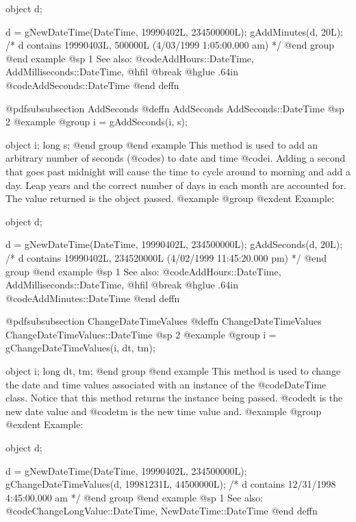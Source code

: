 object  d;

d = gNewDateTime(DateTime, 19990402L, 234500000L);
gAddMinutes(d, 20L);
/*  d contains 19990403L, 500000L
    (4/03/1999 1:05:00.000 am) */
@end group
@end example
@sp 1
See also:  @code{AddHours::DateTime, AddMilliseconds::DateTime,}
@hfil @break @hglue .64in      @code{AddSeconds::DateTime}
@end deffn











@pdfsubsubsection {AddSeconds}
@deffn {AddSeconds} AddSeconds::DateTime
@sp 2
@example
@group
i = gAddSeconds(i, s);

object  i;
long    s;
@end group
@end example
This method is used to add an arbitrary number of seconds (@code{s}) to
date and time @code{i}.  Adding a second that goes past midnight will cause
the time to cycle around to morning and add a day.  Leap years and the correct
number of days in each month are accounted for.  The value returned is the
object passed.
@example
@group
@exdent Example:

object  d;

d = gNewDateTime(DateTime, 19990402L, 234500000L);
gAddSeconds(d, 20L);
/*  d contains 19990402L, 234520000L
    (4/02/1999 11:45:20.000 pm) */
@end group
@end example
@sp 1
See also:  @code{AddHours::DateTime, AddMilliseconds::DateTime,}
@hfil @break @hglue .64in      @code{AddMinutes::DateTime}
@end deffn










@pdfsubsubsection {ChangeDateTimeValues}
@deffn {ChangeDateTimeValues} ChangeDateTimeValues::DateTime
@sp 2
@example
@group
i = gChangeDateTimeValues(i, dt, tm);

object  i;
long    dt, tm;
@end group
@end example
This method is used to change the date and time values associated
with an instance of the @code{DateTime} class.  Notice that this method
returns the instance being passed.  @code{dt} is the new date value and
@code{tm} is the new time value and.
@example
@group
@exdent Example:

object  d;

d = gNewDateTime(DateTime, 19990402L, 234500000L);
gChangeDateTimeValues(d, 19981231L, 44500000L);
/*  d contains 12/31/1998 4:45:00.000 am  */
@end group
@end example
@sp 1
See also:  @code{ChangeLongValue::DateTime, NewDateTime::DateTime}
@end deffn










